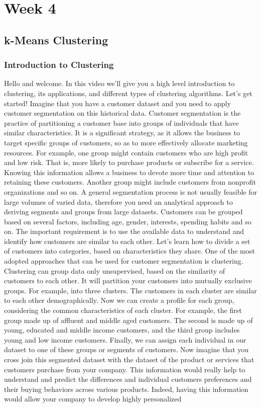 \chapter{Week 4}

\section{k-Means Clustering}

\subsection{Introduction to Clustering}


Hello and welcome. In this video we'll give you a high level introduction to clustering, its applications, and different types of clustering algorithms. Let's get started! Imagine that you have a customer dataset and you need to apply customer segmentation on this historical data. Customer segmentation is the practice of partitioning a customer base into groups of individuals that have similar characteristics. It is a significant strategy, as it allows the business to target specific groups of customers, so as to more effectively allocate marketing resources. For example, one group might contain customers who are high profit and low risk. That is, more likely to purchase products or subscribe for a service. Knowing this information allows a business to devote more time and attention to retaining these customers. Another group might include customers from nonprofit organizations and so on. A general segmentation process is not usually feasible for large volumes of varied data, therefore you need an analytical approach to deriving segments and groups from large datasets. Customers can be grouped based on several factors, including age, gender, interests, spending habits and so on. The important requirement is to use the available data to understand and identify how customers are similar to each other. Let's learn how to divide a set of customers into categories, based on characteristics they share. One of the most adopted approaches that can be used for customer segmentation is clustering. Clustering can group data only unsupervised, based on the similarity of customers to each other. It will partition your customers into mutually exclusive groups. For example, into three clusters. The customers in each cluster are similar to each other demographically. Now we can create a profile for each group, considering the common characteristics of each cluster. For example, the first group made up of affluent and middle aged customers. The second is made up of young, educated and middle income customers, and the third group includes young and low income customers. Finally, we can assign each individual in our dataset to one of these groups or segments of customers. Now imagine that you cross join this segmented dataset with the dataset of the product or services that customers purchase from your company. This information would really help to understand and predict the differences and individual customers preferences and their buying behaviors across various products. Indeed, having this information would allow your company to develop highly personalized 